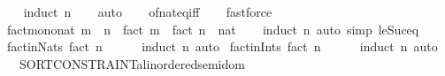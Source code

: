 \begin{isabellebody}
%
\isadelimproof
\ \ %
\endisadelimproof
%
\isatagproof
{}\isamarkupfalse%
\ {\isacharparenleft}{\kern0pt}induct\ n{\isacharparenright}{\kern0pt}\isanewline
\ \ \isamarkupfalse%
\ auto\isanewline
\ \ \isamarkupfalse%
\ of{\isacharunderscore}{\kern0pt}nat{\isacharunderscore}{\kern0pt}eq{\isacharunderscore}{\kern0pt}{}{\isacharunderscore}{\kern0pt}iff\isanewline
\ \ \isamarkupfalse%
\ fastforce\isanewline
\ \ \isamarkupfalse%
%
\endisatagproof
{\isafoldproof}%
%
\isadelimproof
\isanewline
%
\endisadelimproof
\isanewline
{}\isamarkupfalse%
\ fact{\isacharunderscore}{\kern0pt}mono{\isacharunderscore}{\kern0pt}nat{\isacharcolon}{\kern0pt}\ {\isachardoublequoteopen}m\ {\isasymle}\ n\ {\isasymLongrightarrow}\ fact\ m\ {\isasymle}\ {\isacharparenleft}{\kern0pt}fact\ n\ {\isacharcolon}{\kern0pt}{\isacharcolon}{\kern0pt}\ nat{\isacharparenright}{\kern0pt}{\isachardoublequoteclose}\isanewline
%
\isadelimproof
\ \ %
\endisadelimproof
%
\isatagproof
{}\isamarkupfalse%
\ {\isacharparenleft}{\kern0pt}induct\ n{\isacharparenright}{\kern0pt}\ {\isacharparenleft}{\kern0pt}auto\ simp{\isacharcolon}{\kern0pt}\ le{\isacharunderscore}{\kern0pt}Suc{\isacharunderscore}{\kern0pt}eq{\isacharparenright}{\kern0pt}%
\endisatagproof
{\isafoldproof}%
%
\isadelimproof
\isanewline
%
\endisadelimproof
\isanewline
{}\isamarkupfalse%
\ fact{\isacharunderscore}{\kern0pt}in{\isacharunderscore}{\kern0pt}Nats{\isacharcolon}{\kern0pt}\ {\isachardoublequoteopen}fact\ n\ {\isasymin}\ {\isasymnat}{\isachardoublequoteclose}\isanewline
%
\isadelimproof
\ \ %
\endisadelimproof
%
\isatagproof
{}\isamarkupfalse%
\ {\isacharparenleft}{\kern0pt}induct\ n{\isacharparenright}{\kern0pt}\ auto%
\endisatagproof
{\isafoldproof}%
%
\isadelimproof
\isanewline
%
\endisadelimproof
\isanewline
{}\isamarkupfalse%
\ fact{\isacharunderscore}{\kern0pt}in{\isacharunderscore}{\kern0pt}Ints{\isacharcolon}{\kern0pt}\ {\isachardoublequoteopen}fact\ n\ {\isasymin}\ {\isasymint}{\isachardoublequoteclose}\isanewline
%
\isadelimproof
\ \ %
\endisadelimproof
%
\isatagproof
{}\isamarkupfalse%
\ {\isacharparenleft}{\kern0pt}induct\ n{\isacharparenright}{\kern0pt}\ auto%
\endisatagproof
{\isafoldproof}%
%
\isadelimproof
\isanewline
%
\endisadelimproof
\isanewline
{}\isamarkupfalse%
\isanewline
\ \ \ {\isachardoublequoteopen}SORT{\isacharunderscore}{\kern0pt}CONSTRAINT{\isacharparenleft}{\kern0pt}{\isacharprime}{\kern0pt}a{\isacharcolon}{\kern0pt}{\isacharcolon}{\kern0pt}linordered{\isacharunderscore}{\kern0pt}semidom{\isacharparenright}{\kern0pt}{\isachardoublequoteclose}\isanewline

\end{isabellebody}
